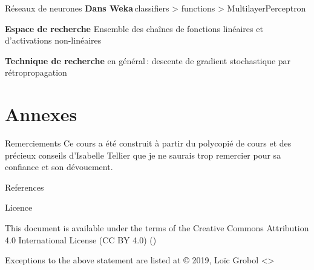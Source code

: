 \documentclass[hyperref={unicode}, xcolor={svgnames}, french]{beamer}
\begin{document}
\begin{frame}{Réseaux de neurones}
    \textbf{Dans Weka} classifiers > functions > MultilayerPerceptron
    \pause

    \textbf{Espace de recherche} Ensemble des chaînes de fonctions linéaires et d'activations non-linéaires
    \pause

    \textbf{Technique de recherche} en général : descente de gradient stochastique par rétropropagation
\end{frame}




\appendix
{}  %
\section{Annexes}
\begin{frame}{Remerciements}
    Ce cours a été construit à partir du polycopié de cours  \parencite{tellier2017IntroductionFouilleTextes} et des précieux conseils d'Isabelle Tellier que je ne saurais trop remercier pour sa confiance et son dévouement.
\end{frame}

\begin{frame}[allowframebreaks]{References}
    \printbibliography[heading=none]
\end{frame}

\begin{frame}{Licence}
    \begin{center}
        {\huge \ccby}
        \vfill
        This document is available under the terms of the Creative Commons Attribution 4.0 International License (CC BY 4.0) ()

        Exceptions to the above statement are listed at {\small{}}
        \vfill
        © 2019, Loïc Grobol <>

    \end{center}
\end{frame}
\end{document}
